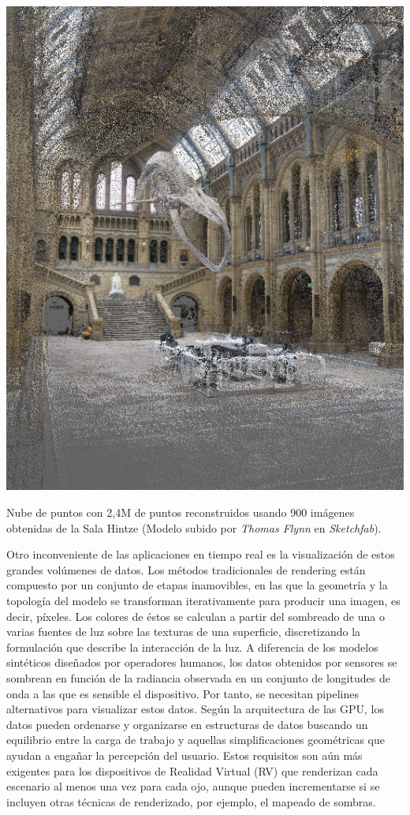 \begin{marginfigure}[.5cm]
	\includegraphics{figs/introduction/hintze.png}
	\caption{Nube de puntos con 2,4M de puntos reconstruidos usando 900 imágenes obtenidas de la Sala Hintze (Modelo subido por \textit{Thomas Flynn} en \textit{Sketchfab}).  }
	\label{fig:hintze_hall_spanish}
\end{marginfigure}
Otro inconveniente de las aplicaciones en tiempo real es la visualización de estos grandes volúmenes de datos. Los métodos tradicionales de rendering están compuesto por un conjunto de etapas inamovibles, en las que la geometría y la topología del modelo se transforman iterativamente para producir una imagen, es decir, píxeles. Los colores de éstos se calculan a partir del sombreado de una o varias fuentes de luz sobre las texturas de una superficie, discretizando la formulación que describe la interacción de la luz. A diferencia de los modelos sintéticos diseñados por operadores humanos, los datos obtenidos por sensores se sombrean en función de la radiancia observada en un conjunto de longitudes de onda a las que es sensible el dispositivo. Por tanto, se necesitan pipelines alternativos para visualizar estos datos. Según la arquitectura de las GPU, los datos pueden ordenarse y organizarse en estructuras de datos buscando un equilibrio entre la carga de trabajo y aquellas simplificaciones geométricas que ayudan a engañar la percepción del usuario. Estos requisitos son aún más exigentes para los dispositivos de Realidad Virtual (RV) que renderizan cada escenario al menos una vez para cada ojo, aunque pueden incrementarse si se incluyen otras técnicas de renderizado, por ejemplo, el mapeado de sombras.   

